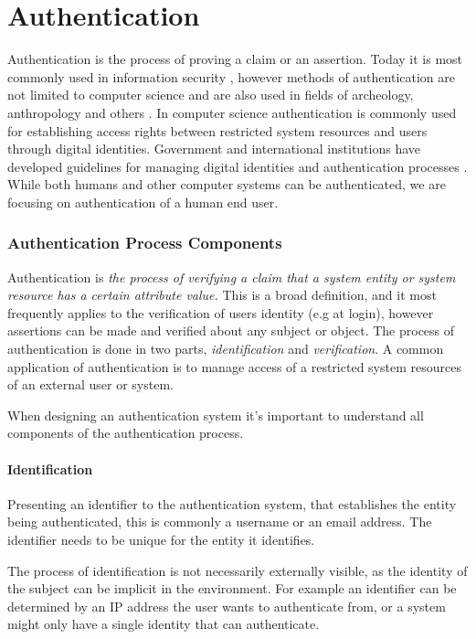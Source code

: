 \section{Authentication}

Authentication is the process of proving a claim or an assertion.
Today it is most commonly used in information security \cite{shirey2007internet}, however methods of authentication are not limited to computer science and are also used in fields of archeology, anthropology and others \cite{Odegaard2014}.
\bigskip
\newline
In computer science authentication is commonly used for establishing access rights between restricted system resources and users through digital identities.
Government and international institutions have developed guidelines for managing digital identities and authentication processes \cite{grassi2017} .
\bigskip
\newline
While both humans and other computer systems can be authenticated, we are focusing on authentication of a human end user.

\subsubsection{Authentication Process Components}
Authentication \cite{shirey2007internet} is \textit{the process of verifying a claim that a system entity or system resource has a certain attribute value.}
This is a broad definition, and it most frequently applies to the verification of users identity (e.g at login), however assertions can be made and verified about any subject or object.
The process of authentication is done in two parts, \textit{identification} and \textit{verification}.
A common application of authentication is to manage access of a restricted system resources of an external user or system.

When designing an authentication system it's important to understand all components of the authentication process.

\paragraph{Identification} Presenting an identifier to the authentication system, that establishes the entity being authenticated, this is commonly a username or an email address.
The identifier needs to be unique for the entity it identifies.

The process of identification is not necessarily externally visible, as the identity of the subject can be implicit in the environment. 
For example an identifier can be determined by an IP address the user wants to authenticate from, or a system might only have a single identity that can authenticate.

